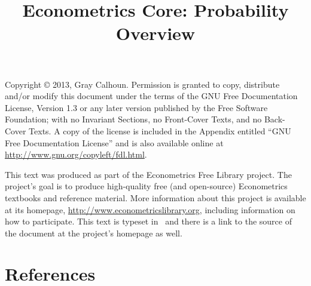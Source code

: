 \documentclass[nofonts]{tufte-latex/tufte-handout}
\title{Econometrics Core: Probability Overview}
\begin{document}
\maketitle

\bigskip\noindent%
Copyright © 2013, Gray Calhoun.  Permission is granted to copy,
distribute and/or modify this document under the terms of the GNU Free
Documentation License, Version 1.3 or any later version published by
the Free Software Foundation; with no Invariant Sections, no
Front-Cover Texts, and no Back-Cover Texts.  A copy of the license is
included in the Appendix entitled ``GNU Free Documentation License''
and is also available online at
\url{http://www.gnu.org/copyleft/fdl.html}.

This text was produced as part of the Econometrics Free Library
project.  The project's goal is to produce high-quality free (and
open-source) Econometrics textbooks and reference material.  More
information about this project is available at its homepage,
\url{http://www.econometricslibrary.org}, including information on how
to participate.  This text is typeset in \XeLaTeX\ and there is a link
to the source of the document at the project's homepage as well.

%
\tableofcontents






\appendix


\part*{References}%


\end{document}

